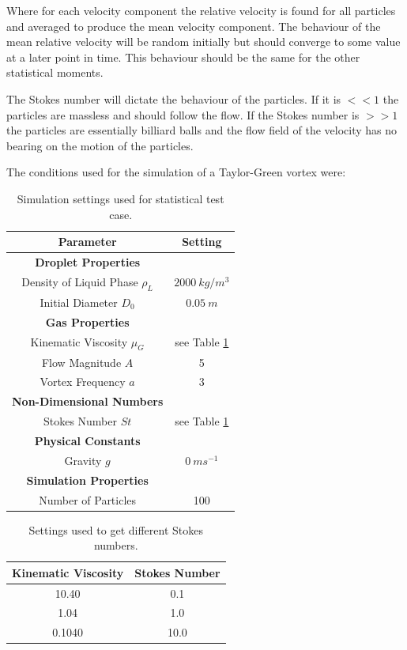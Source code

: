 \documentclass[../Interim_Report_Master]{subfiles}
\begin{document}
Where for each velocity component the relative velocity is found for all particles and averaged to produce the mean velocity component. The behaviour of the mean relative velocity will be random initially but should converge to some value at a later point in time. This behaviour should be the same for the other statistical moments. 

The Stokes number will dictate the behaviour of the particles. If it is $<<1$ the particles are massless and should follow the flow. If the Stokes number is $>>1$ the particles are essentially billiard balls and the flow field of the velocity has no bearing on the motion of the particles.

The conditions used for the simulation of a Taylor-Green vortex were:
\begin{table}[h]
\centering
\begin{tabular}{|c c|}
	\hline
	\textbf{Parameter} & \textbf{Setting} \\ \hline
	\textbf{Droplet Properties} &  \\ 
	Density of Liquid Phase $\rho_L$ & $2000~kg/m^3$ \\
	Initial Diameter $D_0$ & $0.05~m$ \\ \hline 
	\textbf{Gas Properties} &  \\ 
	Kinematic Viscosity $\mu_G$ & see Table \ref{stk_test_case} \\ 
	Flow Magnitude $A$ & 5 \\
	Vortex Frequency $a$ & 3 \\ \hline
	\textbf{Non-Dimensional Numbers} &  \\ 
	Stokes Number $St$ & see Table \ref{stk_test_case}  \\ \hline
	\textbf{Physical Constants} &  \\ 
	Gravity $g$ & $0~ms^{-1}$ \\ \hline
	\textbf{Simulation Properties} &  \\ 
	Number of Particles & 100 \\ \hline
\end{tabular}
\caption{Simulation settings used for statistical test case.}
\end{table}

\begin{table}[h]
\centering
\begin{tabular}{|c c|}
	\hline
	\textbf{Kinematic Viscosity} & \textbf{Stokes Number} \\ \hline
 	10.40 & 0.1 \\
 	1.04 & 1.0 \\
 	0.1040 & 10.0 \\ \hline
\end{tabular}
\caption{Settings used to get different Stokes numbers.}
\label{stk_test_case}
\end{table}
\end{document}
